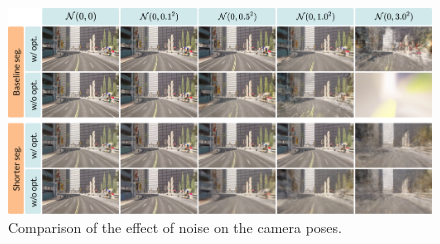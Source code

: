 \begin{figure}[!h]
    \centering
    \includegraphics[width=1.0\textwidth]{figures/noise-combined-comparison.png}
    \caption{Comparison of the effect of noise on the camera poses.}
    \label{fig:noise-combined-comparison}
\end{figure}